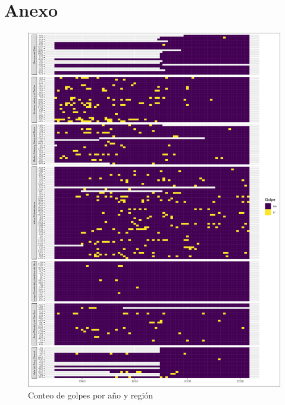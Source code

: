 \documentclass{article}
\begin{document}
\section{Anexo}

\begin{figure}[H]
  \centering  
  \includegraphics[width=1\textwidth]{4_golpes_anios.png}
  \caption{Conteo de golpes por año y región\label{fig:golpes_anios}}
\end{figure}
\end{document}
